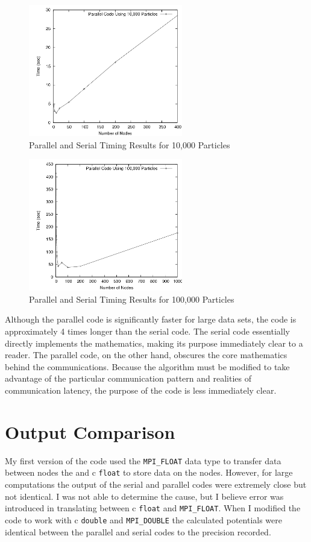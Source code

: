\documentclass{article}
\begin{document}
\begin{figure}
\centering
\includegraphics[width=0.6\textwidth]{img/timing_data_10000_particles.png}
\caption{Parallel and Serial Timing Results for 10,000 Particles}
\label{chart2}
\end{figure}

\begin{figure}
\centering
\includegraphics[width=0.6\textwidth]{img/timing_data_100000_particles.png}
\caption{Parallel and Serial Timing Results for 100,000 Particles}
\label{chart3}
\end{figure}

Although the parallel code is significantly faster for large data sets, the code is approximately 4 times longer than the serial code. The serial code essentially directly implements the mathematics, making its purpose immediately clear to a reader. The parallel code, on the other hand, obscures the core mathematics behind the communications. Because the algorithm must be modified to take advantage of the particular communication pattern and realities of communication latency, the purpose of the code is less immediately clear.

\section{Output Comparison}
\label{outputcomp}
My first version of the code used the \verb!MPI_FLOAT! data type to transfer data between nodes the and c \verb!float! to store data on the nodes. However, for large computations the output of the serial and parallel codes were extremely close but not identical. I was not able to determine the cause, but I believe error was introduced in translating between c \verb!float! and \verb!MPI_FLOAT!. When I modified the code to work with c \verb!double! and \verb!MPI_DOUBLE! the calculated potentials were identical between the parallel and serial codes to the precision recorded.
\end{document}
